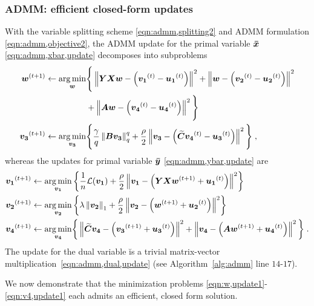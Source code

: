 \subsubsection{ADMM: efficient closed-form updates}
\label{subsec:admm,steps}

With the variable splitting scheme \eqref{eqn:admm,splitting2} and ADMM formulation \eqref{eqn:admm,objective2}, the ADMM update for the primal variable ${\bm{\bar{x}}}$ \eqref{eqn:admm,xbar,update} decomposes into subproblems
\begin{alignat}{1} 
	{\ensuremath{\bm{w}}}^{(t+1)} 	\leftarrow \operatorname*{arg\,min}_{{\bm{w}}}&
		 \Bigg\{\left\| {\bm{Y}}{\bm{X}}{\bm{w}}-\left({\bm{v_1}}^{(t)}-{\bm{u_1}}^{(t)}\right) \right\|^2 
		+ \left\| {\bm{w}}-\left({\bm{v_2}}^{(t)}-{\bm{u_2}}^{(t)}\right) \right\|^2 \nonumber \\
		  &+ \left\| {\bm{A}}{\bm{w}}-\left({\bm{v_4}}^{(t)}-{\bm{u_4}}^{(t)}\right) \right\|^2 \Bigg\} \label{eqn:w,update1} \\
	{\bm{v_3}}^{(t+1)} \leftarrow \operatorname*{arg\,min}_{{\bm{v_3}}}&
		\Bigg\{\frac{\gamma}{q}\left\| {\bm{B}}{\bm{v_3}} \right\|_q^q
		  +\frac{\rho}{2}\left\| {\bm{v_3}}-\left({\bm{\widetilde{C}}}{\bm{v_4}}^{(t)}-{\bm{u_3}}^{(t)}\right) \right\|^2\Bigg\}\;, \label{eqn:v3,update1}
\end{alignat}
whereas the updates for primal variable ${\bm{\bar{y}}}$ \eqref{eqn:admm,ybar,update} are
\begin{alignat}{1} 
	{\ensuremath{\bm{v_1}}}^{(t+1)} \leftarrow \operatorname*{arg\,min}_{{\bm{v_1}}}
		& \left\{ \frac{1}{n}\mathcal{L}({\bm{v_1}}) + \frac{\rho}{2}\left\| {\bm{v_1}}-\left({\bm{Y}}{\bm{X}}{\bm{w}}^{(t+1)}+{\bm{u_1}}^{(t)}\right) \right\|^2 \right\}
			\label{eqn:v1,update1}\\
	{\bm{v_2}}^{(t+1)} \leftarrow \operatorname*{arg\,min}_{{\bm{v_2}}} 
		& \left\{\lambda\left\| {\bm{v_2}} \right\|_1 + \frac{\rho}{2}\left\|    {\bm{v_2}}-\left({\bm{w}}^{(t+1)}+{\bm{u_2}}^{(t)}\right) \right\|^2 
			\label{eqn:v2,update1}\right\}\\
	{\bm{v_4}}^{(t+1)} \leftarrow \operatorname*{arg\,min}_{{\bm{v_4}}}
		& \bigg\{\left\| {\bm{\widetilde{C}}}{\bm{v_4}}-\left({\bm{v_3}}^{(t+1)}+{\bm{u_3}}^{(t)}\right) \right\|^2
		 + \left\| {\bm{v_4}}-\left({\bm{A}}{\bm{w}}^{(t+1)}+{\bm{u_4}}^{(t)}\right) \right\|^2\bigg\} \;.  \label{eqn:v4,update1}
\end{alignat}
The update for the dual variable \u is a trivial matrix-vector \mbox{multiplication \eqref{eqn:admm,dual,update}} (see Algorithm~\ref{alg:admm} line $14$-$17$).

We now demonstrate that the minimization problems \eqref{eqn:w,update1}-\eqref{eqn:v4,update1} each admits an efficient, closed form solution.

\newcommand{\Bvarrho}{\bmath{\varrho}}

